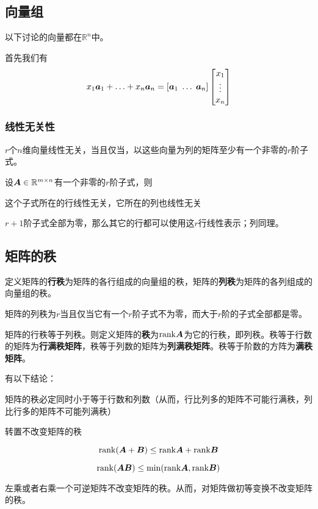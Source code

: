 \documentclass[UTF8]{ctexart}
\theoremstyle{definition}
\renewenvironment{itemize}{\begin{compactitem}}{\end{compactitem}}
\begin{document}
\subsection{向量组}
以下讨论的向量都在$\mathbb{R}^n$中。

首先我们有
\[
    x_1 \vb*{a}_1 + \ldots + x_n \vb*{a}_n = [\vb*{a}_1 \; \ldots \; \vb*{a}_n] 
    \left[
        \begin{matrix}
            x_1 \\
            \vdots \\
            x_n
        \end{matrix}
    \right]
\]

\subsubsection{线性无关性}
$r$个$n$维向量线性无关，当且仅当，以这些向量为列的矩阵至少有一个非零的$r$阶子式。

设$\vb*{A} \in \mathbb{R}^{m \times n}$有一个非零的$r$阶子式，则
\begin{itemize}
    \item 这个子式所在的行线性无关，它所在的列也线性无关
    \item $r+1$阶子式全部为零，那么其它的行都可以使用这$r$行线性表示；列同理。
\end{itemize}

\subsection{矩阵的秩}

定义矩阵的\textbf{行秩}为矩阵的各行组成的向量组的秩，矩阵的\textbf{列秩}为矩阵的各列组成的向量组的秩。

矩阵的列秩为$r$当且仅当它有一个$r$阶子式不为零，而大于$r$阶的子式全部都是零。

矩阵的行秩等于列秩。则定义矩阵的\textbf{秩}为$\mathrm{rank} \vb*{A}$为它的行秩，即列秩。秩等于行数的矩阵为\textbf{行满秩矩阵}，秩等于列数的矩阵为\textbf{列满秩矩阵}。秩等于阶数的方阵为\textbf{满秩矩阵}。

有以下结论： 
\begin{itemize}
    \item 矩阵的秩必定同时小于等于行数和列数（从而，行比列多的矩阵不可能行满秩，列比行多的矩阵不可能列满秩）
    \item 转置不改变矩阵的秩
    \item \[
        \mathrm{rank} (\vb*{A} + \vb*{B}) \leq \mathrm{rank} \vb*{A} + \mathrm{rank} \vb*{B}
    \]
    \item \[
        \mathrm{rank} (\vb*{A} \vb*{B}) \leq \min (\mathrm{rank} \vb*{A}, \mathrm{rank} \vb*{B})
    \]
    \item 左乘或者右乘一个可逆矩阵不改变矩阵的秩。从而，对矩阵做初等变换不改变矩阵的秩。
\end{itemize}
\end{document}

